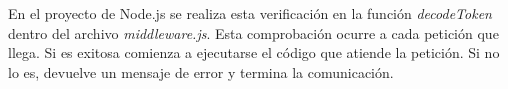 En el proyecto de Node.js se realiza esta verificación en la función \textit{decodeToken} dentro del archivo \textit{middleware.js}. Esta comprobación ocurre a cada petición que llega. Si es exitosa comienza a ejecutarse el código que atiende la petición. Si no lo es, devuelve un mensaje de error y termina la comunicación.